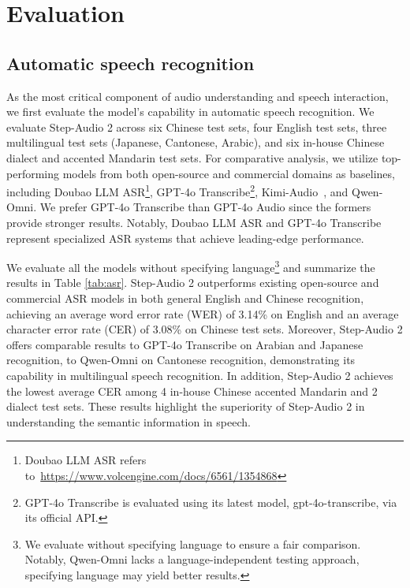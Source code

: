 \section{Evaluation}


\subsection{Automatic speech recognition}
As the most critical component of audio understanding and speech interaction, we first evaluate the model's capability in automatic speech recognition. We evaluate Step-Audio 2 across six Chinese test sets, four English test sets, three multilingual test sets (Japanese, Cantonese, Arabic), and six in-house Chinese dialect and accented Mandarin test sets.
For comparative analysis, we utilize top-performing models from both open-source and commercial domains as baselines, including Doubao LLM ASR\footnote{Doubao LLM ASR refers to~\url{https://www.volcengine.com/docs/6561/1354868}}, GPT-4o Transcribe\footnote{GPT-4o Transcribe is evaluated using its latest model, gpt-4o-transcribe, via its official API.}, Kimi-Audio~\cite{ding2025kimi}, and Qwen-Omni.
We prefer GPT-4o Transcribe than GPT-4o Audio since the formers provide stronger results.
Notably, Doubao LLM ASR and GPT-4o Transcribe represent specialized ASR systems that achieve leading-edge performance.

We evaluate all the models without specifying language\footnote{We evaluate without specifying language to ensure a fair comparison. Notably, Qwen-Omni lacks a language-independent testing approach, specifying language may yield better results.} and summarize the results in Table \ref{tab:asr}.
Step-Audio 2 outperforms existing open-source and commercial ASR models in both general English and Chinese recognition,
achieving an average word error rate (WER) of 3.14\% on English 
and an average character error rate (CER) of 3.08\% on Chinese test sets.
Moreover, Step-Audio 2 offers comparable results to GPT-4o Transcribe on Arabian and Japanese recognition, to Qwen-Omni on Cantonese recognition, demonstrating its capability in multilingual speech recognition.
In addition, Step-Audio 2 achieves the lowest average CER among 4 in-house Chinese accented Mandarin and 2 dialect test sets.
These results highlight the superiority of Step-Audio 2 in understanding the semantic information in speech.

